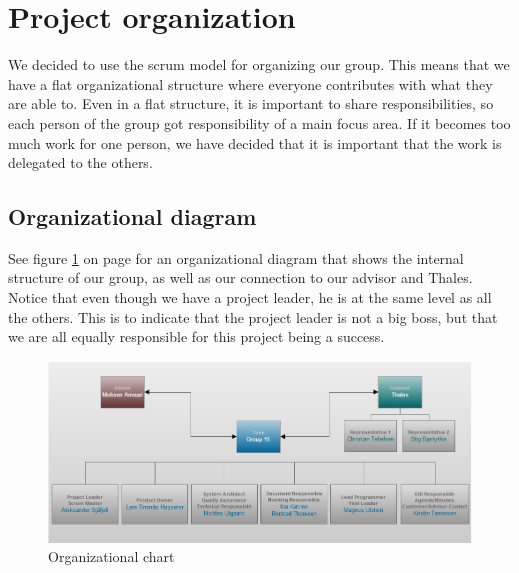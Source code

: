 

\section{Project organization}
We decided to use the scrum model for organizing our group. This means that we have a flat organizational structure where everyone contributes with what they are able to. Even in a flat structure, it is important to share responsibilities, so each person of the group got responsibility of a main focus area. If it becomes too much work for one person, we have decided that it is important that the work is delegated to the others.

\subsection{Organizational diagram}
See figure \ref{fig:organizationalchart} on page \pageref{fig:organizationalchart} for an organizational diagram that shows the internal structure of our group, as well as our connection to our advisor and Thales. Notice that even though we have a project leader, he is at the same level as all the others. This is to indicate that the project leader is not a big boss, but that we are all equally responsible for this project being a success.
\begin{figure}[hbt]
\begin{center}
\includegraphics[width=\textwidth]{Organizational_Chart_v2}
\caption{Organizational chart} \label{fig:organizationalchart}
\end{center}
\end{figure}

\newpage

